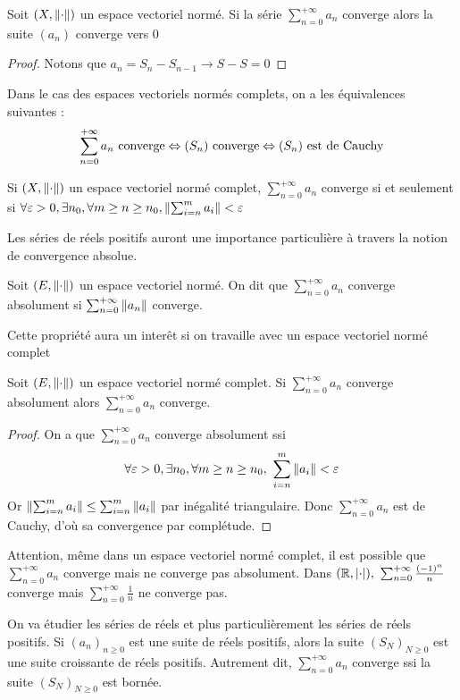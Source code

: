 \begin{proposition}
     Soit $(X,\left\| \cdot \right\|)$ un espace vectoriel normé. Si la série $\sum_{n = 0}^{+\infty} a_n$ converge alors la suite $(a_n)$ converge vers $0$
\end{proposition}
\begin{proof}
    Notons que $a_n = S_n-S_{n-1}\to S-S = 0$
\end{proof}
Dans le cas des espaces vectoriels normés complets, on a les équivalences suivantes : $$\sum_{n=0}^{+\infty}a_n \text{ converge} \Leftrightarrow (S_n) \text{ converge}  \Leftrightarrow (S_n) \text{ est de Cauchy}$$
\begin{proposition}
    Si $(X,\left\| \cdot \right\|)$ un espace vectoriel normé complet, $\sum_{n=0}^{+\infty}a_n$ converge si et seulement si $\forall \varepsilon > 0,\exists n_0,\forall m\ge n \ge n_0, \left\| \sum_{i=n}^{m}a_i \right\|<\varepsilon$
\end{proposition}
Les séries de réels positifs auront une importance particulière à travers la notion de convergence absolue.
\begin{definition}
    Soit $(E,\left\| \cdot \right\|)$ un espace vectoriel normé. On dit que $\sum_{n=0}^{+\infty}a_n$ converge absolument si $\sum_{n=0}^{+\infty}\left\| a_n \right\|$ converge.
\end{definition}
Cette propriété aura un interêt si on travaille avec un espace vectoriel normé complet
\begin{proposition}
    Soit $(E,\left\| \cdot \right\|)$ un espace vectoriel normé complet. Si $\sum_{n=0}^{+\infty}a_n$ converge absolument alors $\sum_{n=0}^{+\infty}a_n$ converge.
\end{proposition}
\begin{proof}
    On a que $\sum_{n=0}^{+\infty}a_n$ converge absolument ssi $$\forall\varepsilon> 0,\exists n_0,\forall m\ge n\ge n_0,\ \sum_{i = n}^{m}\left\| a_i \right\|<\varepsilon$$ Or $\left\| \sum_{i=n}^{m}a_i \right\|\le \sum_{i=n}^{m}\left\| a_i \right\|$ par inégalité triangulaire. Donc $\sum_{n=0}^{+\infty}a_n$ est de Cauchy, d'où sa convergence par complétude.
\end{proof}
\begin{exemple}
    Attention, même dans un espace vectoriel normé complet, il est possible que $\sum_{n=0}^{+\infty}a_n$ converge mais ne converge pas absolument.
    Dans $(\R,\abs\cdot),\ \sum_{n=0}^{+\infty}\frac{(-1)^n}{n}$ converge mais $\sum_{n=0}^{+\infty}\frac 1 n $ ne converge pas.
\end{exemple}
On va étudier les séries de réels et plus particulièrement les séries de réels positifs. Si $(a_n)_{n\ge 0}$ est une suite de réels positifs, alors la suite $(S_N)_{N \ge 0}$ est une suite croissante de réels positifs. Autrement dit, $\sum_{n=0}^{+\infty}a_n$ converge ssi la suite $(S_N)_{N\ge 0}$ est bornée.
